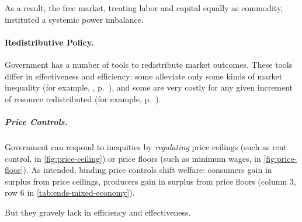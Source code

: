 As a result, the free market, treating labor and capital equally as commodity, instituted a systemic power imbalance.	


\paragraph{Redistributive Policy.}  \label{sec:redistributive-policy} Government has a number of tools to redistribute market outcomes. These tools differ in effectiveness and efficiency: some alleviate only some kinds of market inequality (for example, ,  p.~\pageref{sec:affirmative-action}), and some are very costly for any given increment of resource redistributed (for example,  p.~\pageref{sec:price-controls}).

\subparagraph{Price Controls.}  \label{sec:price-controls} Government can respond to inequities by \emph{regulating} price ceilings (such as rent control, in \autoref{fig:price-ceiling}) or price floors (such as minimum wages, in \autoref{fig:price-floor}). 
As intended, binding price controls shift welfare: consumers gain in surplus from price ceilings, producers gain in surplus from price floors (column 3, row 6 in \autoref{tab:ends-mixed-economy}).

But they gravely lack in efficiency and effectiveness.

